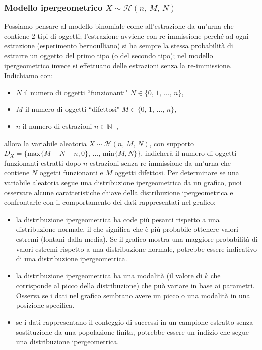 \subsubsection{Modello ipergeometrico $X \sim \mathcal H{(n, \, M, \, N)}$}
Possiamo pensare al modello binomiale come all'estrazione da un'urna che contiene $2$ tipi di oggetti; l'estrazione avviene con re-immissione perché ad ogni estrazione (esperimento bernoulliano) si ha sempre la stessa probabilità di estrarre un oggetto del primo tipo (o del secondo tipo); nel modello ipergeometrico invece si effettuano delle estrazioni senza la re-immissione. \\
Indichiamo con: \begin{itemize}
    \item $N$ il numero di oggetti ``funzionanti" $N \in \{0, \,1, \, ... , \, n\}$,
    \item $M$ il numero di oggetti ``difettosi" $M \in \{0, \,1, \, ... , \, n\}$,
    \item $n$ il numero di estrazioni $n \in \mathbb N^+$,
\end{itemize}
allora la variabile aleatoria $X \sim \mathcal H{(n, \, M, \, N)}$, con supporto $D_X = \{\text{max}\{M + N - n, 0\}, \, ..., \, \text{min}\{M, N\} \}$, indicherà il numero di oggetti funzionanti estratti dopo $n$ estrazioni senza re-immissione da un'urna che contiene $N$ oggetti funzionanti e $M$ oggetti difettosi.
\newline \newline
Per determinare se una variabile aleatoria segue una distribuzione ipergeometrica da un grafico, puoi osservare alcune caratteristiche chiave della distribuzione ipergeometrica e confrontarle con il comportamento dei dati rappresentati nel grafico:
\begin{itemize}
    \item la distribuzione ipergeometrica ha code più pesanti rispetto a una distribuzione normale, il che significa che è più probabile ottenere valori estremi (lontani dalla media). Se il grafico mostra una maggiore probabilità di valori estremi rispetto a una distribuzione normale, potrebbe essere indicativo di una distribuzione ipergeometrica.
    \item la distribuzione ipergeometrica ha una modalità (il valore di $k$ che corrisponde al picco della distribuzione) che può variare in base ai parametri. Osserva se i dati nel grafico sembrano avere un picco o una modalità in una posizione specifica.
    \item se i dati rappresentano il conteggio di successi in un campione estratto senza sostituzione da una popolazione finita, potrebbe essere un indizio che segue una distribuzione ipergeometrica.
\end{itemize}


